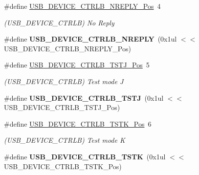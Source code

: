 \begin{DoxyCompactItemize}
\item 
\hypertarget{group___s_a_m_l21___u_s_b_ga6a470d7e7f4e5e0560d525d903014d26}{}\#define \hyperlink{group___s_a_m_l21___u_s_b_ga6a470d7e7f4e5e0560d525d903014d26}{U\+S\+B\+\_\+\+D\+E\+V\+I\+C\+E\+\_\+\+C\+T\+R\+L\+B\+\_\+\+N\+R\+E\+P\+L\+Y\+\_\+\+Pos}~4\label{group___s_a_m_l21___u_s_b_ga6a470d7e7f4e5e0560d525d903014d26}

\begin{DoxyCompactList}\small\item\em (U\+S\+B\+\_\+\+D\+E\+V\+I\+C\+E\+\_\+\+C\+T\+R\+L\+B) No Reply \end{DoxyCompactList}\item 
\hypertarget{group___s_a_m_l21___u_s_b_gafe0cea1f989eb0ce8f909b16240c4ee3}{}\#define {\bfseries U\+S\+B\+\_\+\+D\+E\+V\+I\+C\+E\+\_\+\+C\+T\+R\+L\+B\+\_\+\+N\+R\+E\+P\+L\+Y}~(0x1ul $<$$<$ U\+S\+B\+\_\+\+D\+E\+V\+I\+C\+E\+\_\+\+C\+T\+R\+L\+B\+\_\+\+N\+R\+E\+P\+L\+Y\+\_\+\+Pos)\label{group___s_a_m_l21___u_s_b_gafe0cea1f989eb0ce8f909b16240c4ee3}

\item 
\hypertarget{group___s_a_m_l21___u_s_b_ga72afe21fb229ef70ff43efbf8839402e}{}\#define \hyperlink{group___s_a_m_l21___u_s_b_ga72afe21fb229ef70ff43efbf8839402e}{U\+S\+B\+\_\+\+D\+E\+V\+I\+C\+E\+\_\+\+C\+T\+R\+L\+B\+\_\+\+T\+S\+T\+J\+\_\+\+Pos}~5\label{group___s_a_m_l21___u_s_b_ga72afe21fb229ef70ff43efbf8839402e}

\begin{DoxyCompactList}\small\item\em (U\+S\+B\+\_\+\+D\+E\+V\+I\+C\+E\+\_\+\+C\+T\+R\+L\+B) Test mode J \end{DoxyCompactList}\item 
\hypertarget{group___s_a_m_l21___u_s_b_gaeaa4a68d98b6e11f56ce7b4b83c8684c}{}\#define {\bfseries U\+S\+B\+\_\+\+D\+E\+V\+I\+C\+E\+\_\+\+C\+T\+R\+L\+B\+\_\+\+T\+S\+T\+J}~(0x1ul $<$$<$ U\+S\+B\+\_\+\+D\+E\+V\+I\+C\+E\+\_\+\+C\+T\+R\+L\+B\+\_\+\+T\+S\+T\+J\+\_\+\+Pos)\label{group___s_a_m_l21___u_s_b_gaeaa4a68d98b6e11f56ce7b4b83c8684c}

\item 
\hypertarget{group___s_a_m_l21___u_s_b_ga3a050963c919f7038957a5de784cd02a}{}\#define \hyperlink{group___s_a_m_l21___u_s_b_ga3a050963c919f7038957a5de784cd02a}{U\+S\+B\+\_\+\+D\+E\+V\+I\+C\+E\+\_\+\+C\+T\+R\+L\+B\+\_\+\+T\+S\+T\+K\+\_\+\+Pos}~6\label{group___s_a_m_l21___u_s_b_ga3a050963c919f7038957a5de784cd02a}

\begin{DoxyCompactList}\small\item\em (U\+S\+B\+\_\+\+D\+E\+V\+I\+C\+E\+\_\+\+C\+T\+R\+L\+B) Test mode K \end{DoxyCompactList}\item 
\hypertarget{group___s_a_m_l21___u_s_b_gab67e481a1f1cb87db5b24270c8222d9f}{}\#define {\bfseries U\+S\+B\+\_\+\+D\+E\+V\+I\+C\+E\+\_\+\+C\+T\+R\+L\+B\+\_\+\+T\+S\+T\+K}~(0x1ul $<$$<$ U\+S\+B\+\_\+\+D\+E\+V\+I\+C\+E\+\_\+\+C\+T\+R\+L\+B\+\_\+\+T\+S\+T\+K\+\_\+\+Pos)\label{group___s_a_m_l21___u_s_b_gab67e481a1f1cb87db5b24270c8222d9f}


\end{DoxyCompactItemize}
